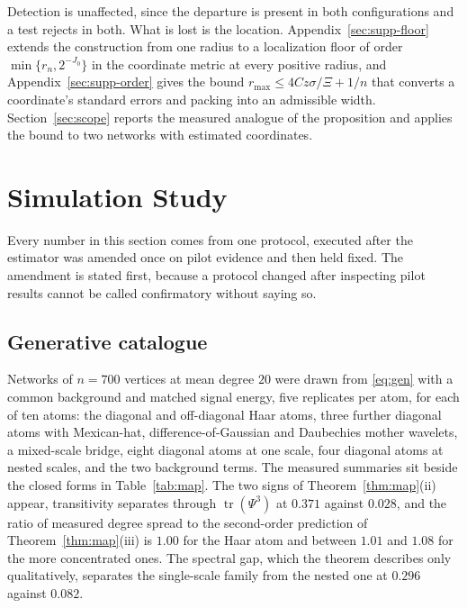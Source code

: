 \documentclass[11pt]{article}
\theoremstyle{definition}
\newcommand{\1}{\mathbf 1}\newcommand{\op}{\operatorname}
\begin{document}
Detection is unaffected, since the departure is present in both configurations
and a test rejects in both.  What is lost is the location.
Appendix~\ref{sec:supp-floor} extends the construction from one radius to a
localization floor of order $\min\{r_n,2^{-J_0}\}$ in the coordinate metric at
every positive radius, and Appendix~\ref{sec:supp-order} gives the bound
$r_{\max}\le4Cz\sigma/\Xi+1/n$ that converts a coordinate's standard errors and
packing into an admissible width.  Section~\ref{sec:scope} reports the
measured analogue of the proposition and applies the bound to two networks
with estimated coordinates.



\section{Simulation Study}                                       \label{sec:sim}

Every number in this section comes from one protocol, executed after the
estimator was amended once on pilot evidence and then held fixed.  The
amendment is stated first, because a protocol changed after inspecting pilot
results cannot be called confirmatory without saying so.

\subsection{Generative catalogue}                          \label{sec:catalogue}

Networks of $n=700$ vertices at mean degree $20$ were drawn from
\eqref{eq:gen} with a common background and matched signal energy, five
replicates per atom, for each of ten atoms: the diagonal and off-diagonal Haar
atoms, three further diagonal atoms with Mexican-hat, difference-of-Gaussian
and Daubechies mother wavelets, a mixed-scale bridge, eight diagonal atoms at
one scale, four diagonal atoms at nested scales, and the two background terms.
The measured summaries sit beside the closed forms in Table~\ref{tab:map}.
The two signs of Theorem~\ref{thm:map}(ii) appear, transitivity separates
through $\operatorname{tr}(\Psi^{3})$ at $0.371$ against $0.028$, and the
ratio of measured degree spread to the second-order prediction of
Theorem~\ref{thm:map}(iii) is $1.00$ for the Haar atom and between $1.01$ and
$1.08$ for the more concentrated ones.  The spectral gap, which the theorem
describes only qualitatively, separates the single-scale family from the
nested one at $0.296$ against $0.082$.
\end{document}
